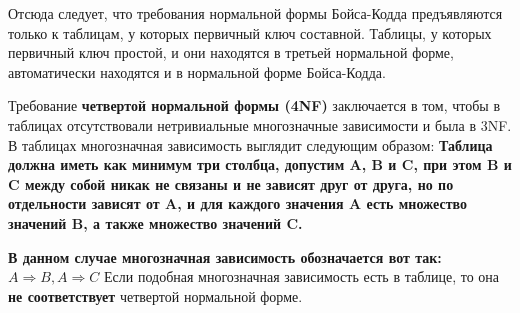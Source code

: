 Отсюда следует, что требования нормальной формы Бойса-Кодда предъявляются только к таблицам, у которых первичный ключ составной. Таблицы, у которых первичный ключ простой, и они находятся в третьей нормальной форме, автоматически находятся и в нормальной форме Бойса-Кодда.

Требование \textbf{четвертой нормальной формы (4NF)} заключается в том, чтобы в таблицах отсутствовали нетривиальные многозначные зависимости и была в 3NF.
В таблицах многозначная зависимость выглядит следующим образом:
\textbf{Таблица должна иметь как минимум три столбца, допустим A, B и C, при этом B и C между собой никак не связаны и не зависят друг от друга, но по отдельности зависят от A, и для каждого значения A есть множество значений B, а также множество значений C.}

\textbf{В данном случае многозначная зависимость обозначается вот так: $A \Rightarrow B, A \Rightarrow C$}
Если подобная многозначная зависимость есть в таблице, то она \textbf{не соответствует} четвертой нормальной форме.






